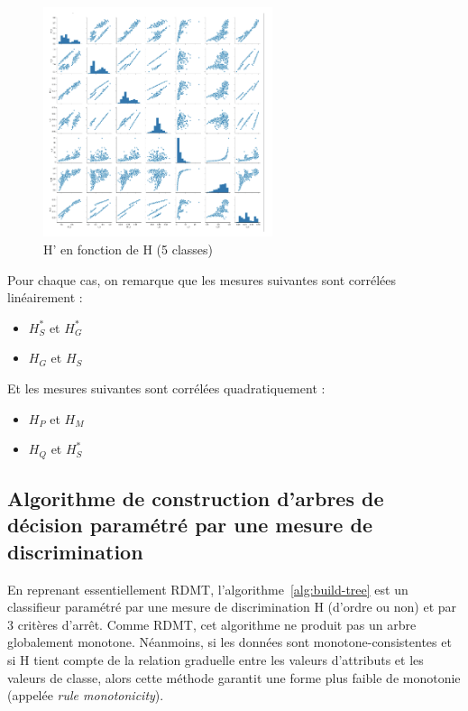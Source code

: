 \documentclass[a4paper]{article}
\begin{document}
\begin{figure}[H]

	\center 
	\includegraphics[width=0.6\textwidth]{images/H_5.png}
    \caption{H' en fonction de H (5 classes)}
    \label{img:H_5}
\end{figure}

Pour chaque cas, on remarque que les mesures suivantes sont corrélées
linéairement :
\begin{itemize}
    \item $H^*_S$ et $H^*_G$
    \item $H_G$ et $H_S$
\end{itemize}

Et les mesures suivantes sont corrélées quadratiquement :
\begin{itemize}
    \item $H_P$ et $H_M$
    \item $H_Q$ et $H^*_S$
\end{itemize}

\subsection{Algorithme de construction d'arbres de décision paramétré par une
mesure de discrimination}

En reprenant essentiellement RDMT, l'algorithme~\ref{alg:build-tree} est un
classifieur paramétré par une mesure de discrimination H (d'ordre ou non) et par
3 critères d'arrêt. Comme RDMT, cet algorithme ne produit pas un arbre
globalement monotone. Néanmoins, si les données sont monotone-consistentes et si
H tient compte de la relation graduelle entre les valeurs d'attributs et les
valeurs de classe, alors cette méthode garantit une forme plus faible de
monotonie (appelée \textit{rule monotonicity}). 
\end{document}
